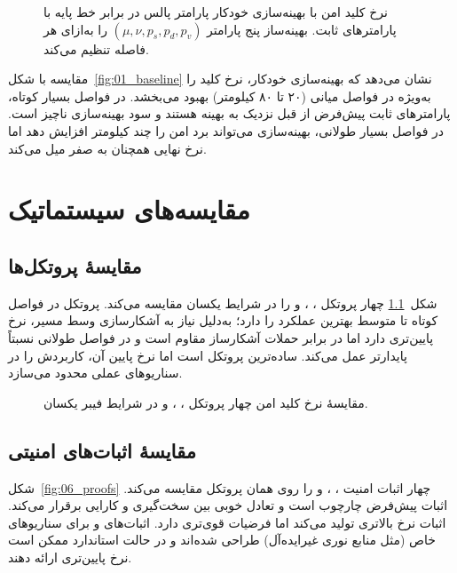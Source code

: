 \begin{figure}[htbp]
\centering
{}
\caption{نرخ کلید امن با بهینه‌سازی خودکار پارامتر پالس در برابر خط پایه با پارامترهای ثابت. بهینه‌ساز  پنج پارامتر $(\mu, \nu, p_s, p_d, p_v)$ را به‌ازای هر فاصله تنظیم می‌کند.}
\label{fig:04_auto_opt}
\end{figure}

مقایسه با شکل~\ref{fig:01_baseline} نشان می‌دهد که بهینه‌سازی خودکار، نرخ کلید را به‌ویژه در فواصل میانی (۲۰ تا ۸۰ کیلومتر) بهبود می‌بخشد. در فواصل بسیار کوتاه، پارامترهای ثابت پیش‌فرض از قبل نزدیک به بهینه هستند و سود بهینه‌سازی ناچیز است. در فواصل بسیار طولانی، بهینه‌سازی می‌تواند برد امن را چند کیلومتر افزایش دهد اما نرخ نهایی همچنان به صفر میل می‌کند.

\chapter{مقایسه‌های سیستماتیک}
\label{ch:results_comparisons}

\section{مقایسهٔ پروتکل‌ها}
شکل~\ref{fig:05_protocols} چهار پروتکل ، ،  و  را در شرایط یکسان مقایسه می‌کند. پروتکل  در فواصل کوتاه تا متوسط بهترین عملکرد را دارد؛  به‌دلیل نیاز به آشکارسازی وسط مسیر، نرخ پایین‌تری دارد اما در برابر حملات آشکارساز مقاوم است و در فواصل طولانی نسبتاً پایدارتر عمل می‌کند.  ساده‌ترین پروتکل است اما نرخ پایین آن، کاربردش را در سناریوهای عملی محدود می‌سازد.

\begin{figure}[htbp]
\centering
{}
\caption{مقایسهٔ نرخ کلید امن چهار پروتکل ، ،  و  در شرایط فیبر یکسان.}
\label{fig:05_protocols}
\end{figure}

\section{مقایسهٔ اثبات‌های امنیتی}
شکل~\ref{fig:06_proofs} چهار اثبات امنیت ، ،  و  را روی همان پروتکل  مقایسه می‌کند. اثبات  پیش‌فرض چارچوب است و تعادل خوبی بین سخت‌گیری و کارایی برقرار می‌کند. اثبات  نرخ بالاتری تولید می‌کند اما فرضیات قوی‌تری دارد. اثبات‌های  و  برای سناریوهای خاص (مثل منابع نوری غیرایده‌آل) طراحی شده‌اند و در حالت استاندارد ممکن است نرخ پایین‌تری ارائه دهند.

